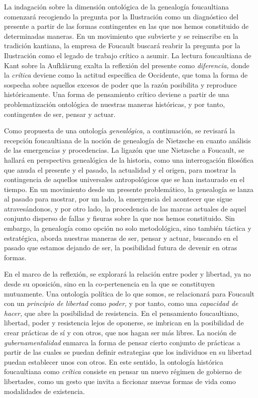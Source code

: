 La indagación sobre la dimensión ontológica de la genealogía
foucaultiana comenzará recogiendo la pregunta por la Ilustración como un
diagnóstico del presente a partir de las formas contingentes en las que
nos hemos constituido de determinadas maneras. En un movimiento que
subvierte y se reinscribe en la tradición kantiana, la empresa de
Foucault buscará reabrir la pregunta por la Ilustración como el legado
de trabajo crítico a asumir. La lectura foucaultiana de Kant sobre la
Aufklärung exalta la reflexión del presente como \emph{diferencia,}
donde la \emph{crítica} deviene como la actitud específica de Occidente,
que toma la forma de sospecha sobre aquellos excesos de poder que la
razón posibilita y reproduce históricamente. Una forma de pensamiento
crítico deviene a partir de una problematización ontológica de nuestras
maneras históricas, y por tanto, contingentes de ser, pensar y actuar.

Como propuesta de una ontología \emph{genealógica,} a continuación, se
revisará la recepción foucaultiana de la noción de genealogía de
Nietzsche en cuanto análisis de las emergencias y procedencias. La
ligazón que une Nietzsche a Foucault, se hallará en perspectiva
genealógica de la historia, como una interrogación filosófica que anuda
el presente y el pasado, la actualidad y el origen, para mostrar la
contingencia de aquellos universales antropológicos que se han
instaurado en el tiempo. En un movimiento desde un presente
problemático, la genealogía se lanza al pasado para mostrar, por un
lado, la emergencia del acontecer que sigue atravesándonos, y por otro
lado, la procedencia de las marcas actuales de aquel conjunto disperso
de fallas y fisuras sobre la que nos hemos constituido. Sin embargo, la
genealogía como opción no solo metodológica, sino también táctica y
estratégica, aborda nuestras maneras de ser, pensar y actuar, buscando
en el pasado que estamos dejando de ser, la posibilidad futura de
devenir en otras formas.

En el marco de la reflexión, se explorará la relación entre poder y
libertad, ya no desde su oposición, sino en la co-pertenencia en la que
se constituyen mutuamente. Una ontología política de lo que somos, se
relacionará para Foucault con un \emph{principio de libertad} como
\emph{poder,} y por tanto, como una \emph{capacidad de hacer,} que abre
la posibilidad de resistencia. En el pensamiento foucaultiano, libertad,
poder y resistencia lejos de oponerse, se imbrican en la posibilidad de
crear prácticas de sí y con otros, que nos hagan ser más libres. La
noción de \emph{gubernamentalidad} enmarca la forma de pensar cierto
conjunto de prácticas a partir de las cuales se puedan definir
estrategias que los individuos en su libertad puedan establecer unos con
otros. En este sentido, la ontología histórica foucaultiana como
\emph{crítica} consiste en pensar un nuevo régimen de gobierno de
libertades, como un gesto que invita a ficcionar nuevas formas de vida
como modalidades de existencia.

